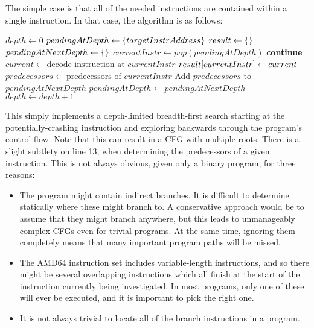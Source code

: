The simple case is that all of the needed instructions are contained
within a single instruction.  In that case, the algorithm is as
follows:

\begin{algorithmic}[1]
\State $depth \gets 0$
\State $pendingAtDepth \gets \{targetInstrAddress\}$
\State $result \gets \{\}$
  \State $pendingAtNextDepth \gets \{\}$
    \State $currentInstr \gets pop(pendingAtDepth)$
      \State \textbf{continue}
    \EndIf
    \State $current \gets \text{decode instruction at } currentInstr$
    \State $result[currentInstr] \gets current$
    \State $predecessors \gets \text{predecessors of } currentInstr$
    \State Add $predecessors$ to $pendingAtNextDepth$
  \EndWhile
  \State $pendingAtDepth \gets pendingAtNextDepth$
  \State $depth \gets depth + 1$
\EndWhile
\end{algorithmic}

This simply implements a depth-limited breadth-first search starting
at the potentially-crashing instruction and exploring backwards
through the program's control flow.  Note that this can result in a
CFG with multiple roots.  There is a slight subtlety on line 13, when
determining the predecessors of a given instruction.  This is not
always obvious, given only a binary program, for three reasons:

\begin{itemize}
\item
  The program might contain indirect branches.  It is difficult to
  determine statically where these might branch to.  A conservative
  approach would be to assume that they might branch anywhere, but
  this leads to unmanageably complex CFGs even for trivial programs.
  At the same time, ignoring them completely means that many important
  program paths will be missed.
\item
  The AMD64 instruction set includes variable-length instructions, and
  so there might be several overlapping instructions which all finish
  at the start of the instruction currently being investigated.  In
  most programs, only one of these will ever be executed, and it is
  important to pick the right one.
\item
  It is not always trivial to locate all of the branch instructions in
  a program.
\end{itemize}

